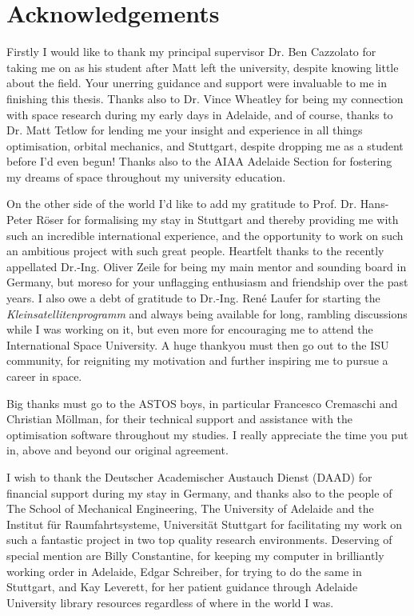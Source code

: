 \chapter*{Acknowledgements}

Firstly I would like to thank my principal supervisor Dr. Ben Cazzolato for taking me on as his student after Matt left the university, despite knowing little about the field. Your unerring guidance and support were invaluable to me in finishing this thesis. Thanks also to Dr. Vince Wheatley for being my connection with space research during my early days in Adelaide, and of course, thanks to Dr. Matt Tetlow for lending me your insight and experience in all things optimisation, orbital mechanics, and Stuttgart, despite dropping me as a student before I'd even begun! Thanks also to the AIAA Adelaide Section for fostering my dreams of space throughout my university education.

On the other side of the world I'd like to add my gratitude to Prof. Dr. Hans-Peter R\"{o}ser for formalising my stay in Stuttgart and thereby providing me with such an incredible international experience, and the opportunity to work on such an ambitious project with such great people. Heartfelt thanks to the recently appellated Dr.-Ing. Oliver Zeile for being my main mentor and sounding board in Germany, but moreso for your unflagging enthusiasm and friendship over the past years. I also owe a debt of gratitude to Dr.-Ing. Ren\'{e} Laufer for starting the \emph{Kleinsatellitenprogramm} and always being available for long, rambling discussions while I was working on it, but even more for encouraging me to attend the International Space University. A huge thankyou must then go out to the ISU community, for reigniting my motivation and further inspiring me to pursue a career in space.

Big thanks must go to the ASTOS boys, in particular Francesco Cremaschi and Christian M\"{o}llman, for their technical support and assistance with the optimisation software throughout my studies. I really appreciate the time you put in, above and beyond our original agreement.

I wish to thank the Deutscher Academischer Austauch Dienst (DAAD) for financial support during my stay in Germany, and thanks also to the people of The School of Mechanical Engineering, The University of Adelaide and the Institut f\"{u}r Raumfahrtsysteme, Universit\"{a}t Stuttgart for facilitating my work on such a fantastic project in two top quality research environments. Deserving of special mention are Billy Constantine, for keeping my computer in brilliantly working order in Adelaide, Edgar Schreiber, for trying to do the same in Stuttgart, and Kay Leverett, for her patient guidance through Adelaide University library resources regardless of where in the world I was.

